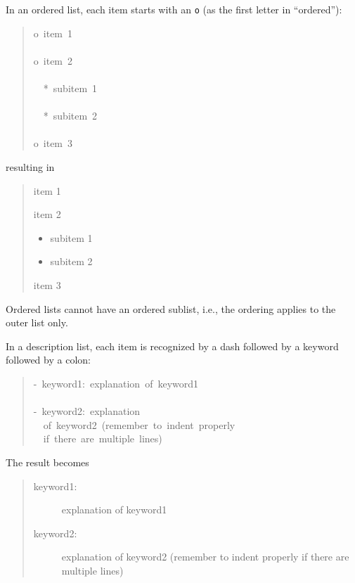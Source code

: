 \documentclass[a4paper,english]{article}
\begin{document}
In an ordered list, each item starts with an \texttt{o} (as the first letter
in ``ordered''):
%
\begin{quote}{\ttfamily \raggedright \noindent
o~item~1\\
~\\
o~item~2\\
~\\
~~*~subitem~1\\
~\\
~~*~subitem~2\\
~\\
o~item~3
}
\end{quote}

resulting in
%
\begin{quote}
\setcounter{listcnt0}{0}
\begin{list}{.}
{
\setlength{\rightmargin}{\leftmargin}
}

\item item 1

\item item 2
%
\begin{itemize}

\item subitem 1

\item subitem 2

\end{itemize}

\item item 3
\end{list}

\end{quote}

Ordered lists cannot have an ordered sublist, i.e., the ordering
applies to the outer list only.

In a description list, each item is recognized by a dash followed
by a keyword followed by a colon:
%
\begin{quote}{\ttfamily \raggedright \noindent
-~keyword1:~explanation~of~keyword1\\
~\\
-~keyword2:~explanation\\
~~of~keyword2~(remember~to~indent~properly\\
~~if~there~are~multiple~lines)
}
\end{quote}

The result becomes
%
\begin{quote}
%
\begin{description}
\item[{keyword1:}] \leavevmode 
explanation of keyword1

\item[{keyword2:}] \leavevmode 
explanation
of keyword2 (remember to indent properly
if there are multiple lines)

\end{description}

\end{quote}
\end{document}
